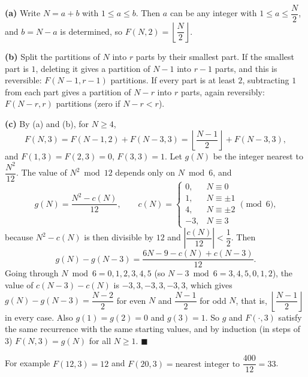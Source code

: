 \textbf{(a)} Write $N=a+b$ with $1\le a\le b$. Then $a$ can be any integer with $1\le a\le\dfrac {N}{2}$, and $b=N-a$ is determined, so $F(N,2)=\left\lfloor\dfrac {N}{2}\right\rfloor$.

\textbf{(b)} Split the partitions of $N$ into $r$ parts by their smallest part. If the smallest part is $1$, deleting it gives a partition of $N-1$ into $r-1$ parts, and this is reversible: $F(N-1,r-1)$ partitions. If every part is at least $2$, subtracting $1$ from each part gives a partition of $N-r$ into $r$ parts, again reversibly: $F(N-r,r)$ partitions (zero if $N-r<r$).

\textbf{(c)} By (a) and (b), for $N\ge4$,
\[
F(N,3)=F(N-1,2)+F(N-3,3)=\left\lfloor\dfrac{N-1}{2}\right\rfloor+F(N-3,3),
\]
and $F(1,3)=F(2,3)=0$, $F(3,3)=1$. Let $g(N)$ be the integer nearest to $\dfrac{N^2}{12}$. The value of $N^2\bmod12$ depends only on $N\bmod6$, and
\[
g(N)=\dfrac{N^2-c(N)}{12},\qquad c(N)=\begin{cases}0,&N\equiv0\\ 1,&N\equiv\pm1\\ 4,&N\equiv\pm2\\ -3,&N\equiv3\end{cases}\pmod 6,
\]
because $N^2-c(N)$ is then divisible by $12$ and $\left|\dfrac{c(N)}{12}\right|<\dfrac{1}{2}$. Then
\[
g(N)-g(N-3)=\dfrac{6N-9-c(N)+c(N-3)}{12}.
\]
Going through $N\bmod6=0,1,2,3,4,5$ (so $N-3\bmod6=3,4,5,0,1,2$), the value of $c(N-3)-c(N)$ is $-3,3,-3,3,-3,3$, which gives $g(N)-g(N-3)=\dfrac{N-2}{2}$ for even $N$ and $\dfrac{N-1}{2}$ for odd $N$, that is, $\left\lfloor\dfrac{N-1}{2}\right\rfloor$ in every case. Also $g(1)=g(2)=0$ and $g(3)=1$. So $g$ and $F(\cdot,3)$ satisfy the same recurrence with the same starting values, and by induction (in steps of $3$) $F(N,3)=g(N)$ for all $N\ge1$. $\blacksquare$

For example $F(12,3)=12$ and $F(20,3)=\text{nearest integer to }\dfrac{400}{12}=33$.
